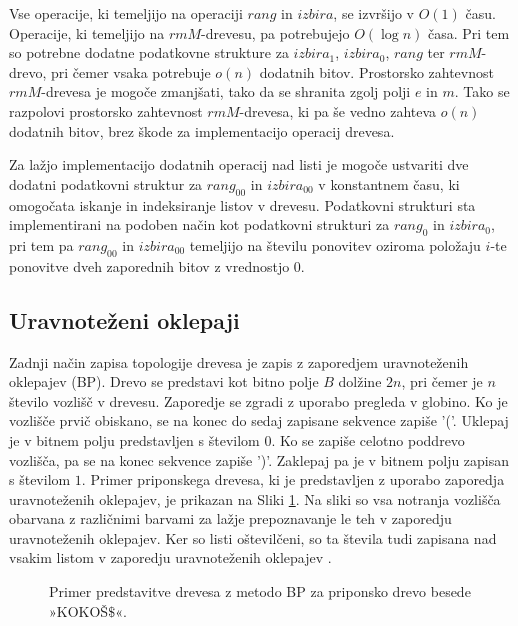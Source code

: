 Vse operacije, ki temeljijo na operaciji $rang$ in $izbira$, se izvršijo v $O(1)$ času. Operacije, ki temeljijo na $rmM$-drevesu, pa potrebujejo $O(\log{n})$ časa. Pri tem so potrebne dodatne podatkovne strukture za $izbira_1$, $izbira_0$, $rang$ ter $rmM$-drevo, pri čemer vsaka potrebuje $o(n)$ dodatnih bitov. Prostorsko zahtevnost $rmM$-drevesa je mogoče zmanjšati, tako da se shranita zgolj polji $e$ in $m$. Tako se razpolovi prostorsko zahtevnost $rmM$-drevesa, ki pa še vedno zahteva $o(n)$ dodatnih bitov, brez škode za implementacijo operacij drevesa.

Za lažjo implementacijo dodatnih operacij nad listi je mogoče ustvariti dve dodatni podatkovni struktur za $rang_{00}$ in $izbira_{00}$ v konstantnem času, ki omogočata iskanje in indeksiranje listov v drevesu. Podatkovni strukturi sta implementirani na podoben način kot podatkovni strukturi za $rang_0$ in $izbira_0$, pri tem pa $rang_{00}$ in $izbira_{00}$ temeljijo na številu ponovitev oziroma položaju $i$-te ponovitve dveh zaporednih bitov z vrednostjo 0.

\subsection{Uravnoteženi oklepaji}\label{sec:oklepaji}

Zadnji način zapisa topologije drevesa je zapis z zaporedjem uravnoteženih oklepajev (BP). Drevo se predstavi kot bitno polje $B$ dolžine $2n$, pri čemer je $n$ število vozlišč v drevesu. Zaporedje se zgradi z uporabo pregleda v globino. Ko je vozlišče prvič obiskano, se na konec do sedaj zapisane sekvence zapiše '('. Uklepaj je v bitnem polju predstavljen s številom $0$. Ko se zapiše celotno poddrevo vozlišča, pa se na konec sekvence zapiše ')'. Zaklepaj pa je v bitnem polju zapisan s številom $1$. Primer priponskega drevesa, ki je predstavljen z uporabo zaporedja uravnoteženih oklepajev, je prikazan na Sliki \ref{fig:BP}. Na sliki so vsa notranja vozlišča obarvana z različnimi barvami za lažje prepoznavanje le teh v zaporedju uravnoteženih oklepajev. Ker so listi oštevilčeni, so ta števila tudi zapisana nad vsakim listom v zaporedju uravnoteženih oklepajev \cite{Navarro2016}.

\begin{figure}[htb]
    \begin{center}
        
        \caption{Primer predstavitve drevesa z metodo BP za priponsko drevo besede »KOKOŠ$\$$«.} 
        \label{fig:BP}
    \end{center}
\end{figure}

